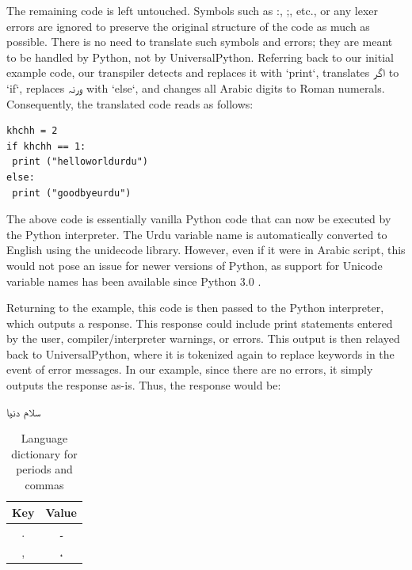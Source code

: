 \documentclass[conference]{IEEEtran}
\begin{document}
The remaining code is left untouched. Symbols such as :, ;, etc., or any lexer errors are ignored to preserve the original structure of the code as much as possible. There is no need to translate such symbols and errors; they are meant to be handled by Python, not by UniversalPython. Referring back to our initial example code, our transpiler detects and replaces it with `print`, translates \texturdu{اگر} to `if`, replaces \texturdu{ورنہ} with `else`, and changes all Arabic digits to Roman numerals. Consequently, the translated code reads as follows:

\begin{lstlisting}
khchh = 2
if khchh == 1:
 print ("helloworldurdu")
else:
 print ("goodbyeurdu")
\end{lstlisting}

The above code is essentially vanilla Python code that can now be executed by the Python interpreter. The Urdu variable name is automatically converted to English using the unidecode library. However, even if it were in Arabic script, this would not pose an issue for newer versions of Python, as support for Unicode variable names has been available since Python 3.0 \cite{coghlan2014transition}.

Returning to the example, this code is then passed to the Python interpreter, which outputs a response. This response could include print statements entered by the user, compiler/interpreter warnings, or errors. This output is then relayed back to UniversalPython, where it is tokenized again to replace keywords in the event of error messages. In our example, since there are no errors, it simply outputs the response as-is. Thus, the response would be:

\begin{urdu} %
\urdufont 
سلام دنیا

\end{urdu} %
  
\begin{table}[h]
\centering
\caption{Language dictionary for periods and commas}
\label{tab:language_dictionary}
\vspace{3mm}
\begin{tabular}{cc}
\hline
Key & Value \\
\hline
. & \texturdu{۔} \\
, & \texturdu{،} \\
\hline
\end{tabular}
\end{table}
\end{document}
